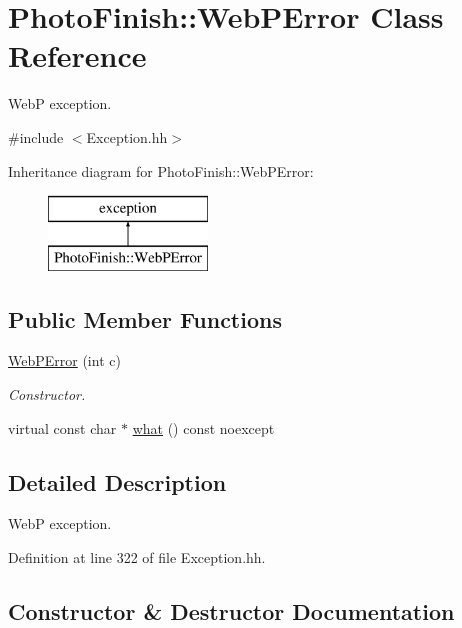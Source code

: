 \hypertarget{class_photo_finish_1_1_web_p_error}{}\section{Photo\+Finish\+:\+:Web\+P\+Error Class Reference}
\label{class_photo_finish_1_1_web_p_error}


WebP exception.  




{\ttfamily \#include $<$Exception.\+hh$>$}

Inheritance diagram for Photo\+Finish\+:\+:Web\+P\+Error\+:\begin{figure}[H]
\begin{center}
\leavevmode
\includegraphics[height=2.000000cm]{class_photo_finish_1_1_web_p_error}
\end{center}
\end{figure}
\subsection*{Public Member Functions}
\begin{DoxyCompactItemize}
\item 
\hyperlink{class_photo_finish_1_1_web_p_error_a1d69d44bb5fd8faeb951ea8df8674239}{Web\+P\+Error} (int c)
\begin{DoxyCompactList}\small\item\em Constructor. \end{DoxyCompactList}\item 
virtual const char $\ast$ \hyperlink{class_photo_finish_1_1_web_p_error_a1db4a07a927d2323ef499b3d84f1b42d}{what} () const noexcept
\end{DoxyCompactItemize}


\subsection{Detailed Description}
WebP exception. 

Definition at line 322 of file Exception.\+hh.



\subsection{Constructor \& Destructor Documentation}
\mbox{\label{class_photo_finish_1_1_web_p_error_a1d69d44bb5fd8faeb951ea8df8674239}} 
